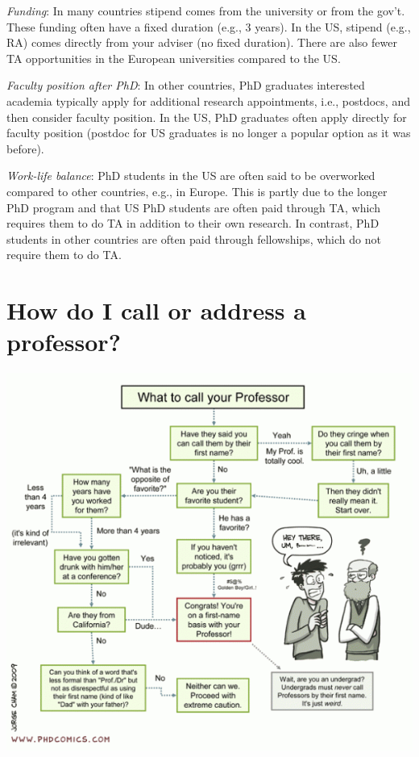 \documentclass[oneside,11pt]{memoir}
\begin{document}
\emph{Funding}:  In many countries stipend comes from the university or from the gov't. These funding often have a fixed duration (e.g., 3 years).  In the US, stipend (e.g., RA) comes directly from your adviser (no fixed duration).  There are also fewer TA opportunities in the European universities compared to the US.

\emph{Faculty position after PhD}: In other countries, PhD graduates interested academia typically apply for additional research appointments, i.e., postdocs, and then consider faculty position. In the US, PhD graduates often apply directly for faculty position (postdoc for US graduates is no longer a popular option as it was before).  %

\emph{Work-life balance}: PhD students in the US are often said to be overworked compared to other countries, e.g., in Europe.  This is partly due to the longer PhD program and that US PhD students are often paid through TA, which requires them to do TA in addition to their own research. In contrast, PhD students in other countries are often paid through fellowships, which do not require them to do TA.



\section{How do I call or address a professor?}\label{sec:address}

\begin{center}
  \includegraphics[scale=0.5]{files/c5.png}
\end{center}
\end{document}
